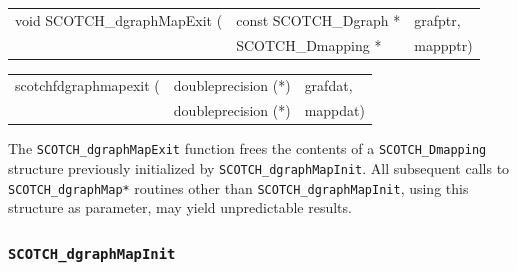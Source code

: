 \begin{itemize}
\progsyn

{\tt\begin{tabular}{l@{}ll}
void SCOTCH\_dgraphMapExit ( & const SCOTCH\_Dgraph * & grafptr, \\
                             & SCOTCH\_Dmapping *     & mappptr)
\end{tabular}}

{\tt\begin{tabular}{l@{}ll}
scotchfdgraphmapexit ( & doubleprecision (*) & grafdat, \\
                       & doubleprecision (*) & mappdat)
\end{tabular}}

\progdes

The {\tt SCOTCH\_dgraphMapExit} function frees the contents of a
{\tt SCOTCH\_\lbt Dmapping} structure previously initialized by
{\tt SCOTCH\_\lbt dgraph\lbt Map\lbt Init}. All subsequent calls to
{\tt SCOTCH\_\lbt dgraph\lbt Map*} routines other than
{\tt SCOTCH\_\lbt dgraph\lbt Map\lbt Init}, using this structure
as parameter, may yield unpredictable results.
\end{itemize}

\subsubsection{{\tt SCOTCH\_dgraphMapInit}}
\label{sec-lib-func-dgraphmapinit}


